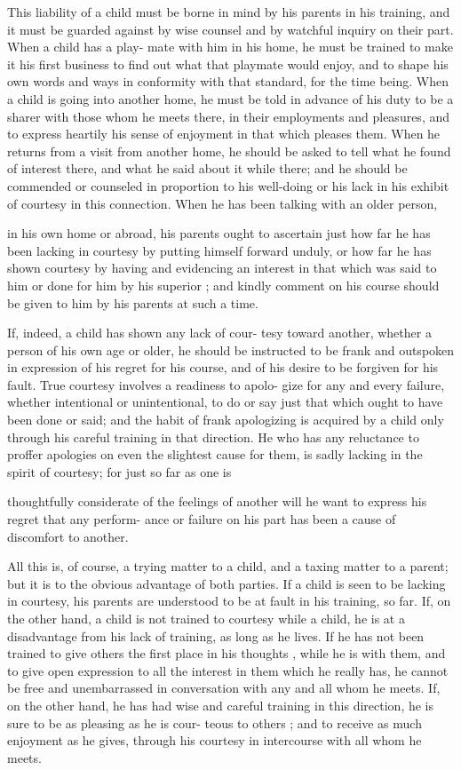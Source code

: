 \documentclass[
]{book}
\begin{document}
This liability of a child must be borne in mind by his parents in his training, and it must be guarded against by wise counsel and by watchful inquiry on their part. When a child has a play- mate with him in his home, he must be trained to make it his first business to find out what that playmate would enjoy, and to shape his own words and ways in conformity with that standard, for the time being. When a child is going into another home, he must be told in advance of his duty to be a sharer with those whom he meets there, in their employments and pleasures, and to express heartily his sense of enjoyment in that which pleases them. When he returns from a visit from another home, he should be asked to tell what he found of interest there, and what he said about it while there; and he should be commended or counseled in proportion to his well-doing or his lack in his exhibit of courtesy in this connection. When he has been talking with an older person,

in his own home or abroad, his parents ought to ascertain just how far he has been lacking in courtesy by putting himself forward unduly, or how far he has shown courtesy by having and evidencing an interest in that which was said to him or done for him by his superior ; and kindly comment on his course should be given to him by his parents at such a time.

If, indeed, a child has shown any lack of cour- tesy toward another, whether a person of his own age or older, he should be instructed to be frank and outspoken in expression of his regret for his course, and of his desire to be forgiven for his fault. True courtesy involves a readiness to apolo- gize for any and every failure, whether intentional or unintentional, to do or say just that which ought to have been done or said; and the habit of frank apologizing is acquired by a child only through his careful training in that direction. He who has any reluctance to proffer apologies on even the slightest cause for them, is sadly lacking in the spirit of courtesy; for just so far as one is

thoughtfully considerate of the feelings of another will he want to express his regret that any perform- ance or failure on his part has been a cause of discomfort to another.

All this is, of course, a trying matter to a child, and a taxing matter to a parent; but it is to the obvious advantage of both parties. If a child is seen to be lacking in courtesy, his parents are understood to be at fault in his training, so far. If, on the other hand, a child is not trained to courtesy while a child, he is at a disadvantage from his lack of training, as long as he lives. If he has not been trained to give others the first place in his thoughts , while he is with them, and to give open expression to all the interest in them which he really has, he cannot be free and unembarrassed in conversation with any and all whom he meets. If, on the other hand, he has had wise and careful training in this direction, he is sure to be as pleasing as he is cour- teous to others ; and to receive as much enjoyment as he gives, through his courtesy in intercourse with all whom he meets.
\end{document}
